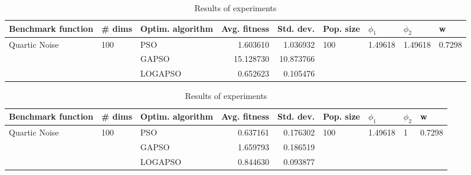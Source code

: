 \documentclass{article}
\begin{document}
\begin{table}
\centering
\caption{Results of experiments}
\begin{tabular}{lllrrllll}
\toprule
            Benchmark function &              \# dims & Optim. algorithm &  Avg. fitness &  Std. dev. &            Pop. size &               $\phi_{1}$ &               $\phi_{2}$ &                       w \\
\midrule
\multirow{3}{*}{Quartic Noise} & \multirow{3}{*}{100} &              PSO &      1.603610 &   1.036932 & \multirow{3}{*}{100} & \multirow{3}{*}{1.49618} & \multirow{3}{*}{1.49618} & \multirow{3}{*}{0.7298} \\
                               &                      &            GAPSO &     15.128730 &  10.873766 &                      &                          &                          &                         \\
                               &                      &          LOGAPSO &      0.652623 &   0.105476 &                      &                          &                          &                         \\
\bottomrule
\end{tabular}
\end{table}
\begin{table}
\centering
\caption{Results of experiments}
\begin{tabular}{lllrrllll}
\toprule
            Benchmark function &              \# dims & Optim. algorithm &  Avg. fitness &  Std. dev. &            Pop. size &               $\phi_{1}$ &         $\phi_{2}$ &                       w \\
\midrule
\multirow{3}{*}{Quartic Noise} & \multirow{3}{*}{100} &              PSO &      0.637161 &   0.176302 & \multirow{3}{*}{100} & \multirow{3}{*}{1.49618} & \multirow{3}{*}{1} & \multirow{3}{*}{0.7298} \\
                               &                      &            GAPSO &      1.659793 &   0.186519 &                      &                          &                    &                         \\
                               &                      &          LOGAPSO &      0.844630 &   0.093877 &                      &                          &                    &                         \\
\bottomrule
\end{tabular}
\end{table}
\end{document}
